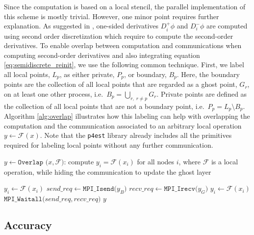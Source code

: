 Since the computation is based on a local stencil, the parallel implementation of this scheme is mostly trivial. However, one minor point requires further explanation. As suggested in \cite{Min;Gibou:07:A-second-order-accur}, one-sided derivatives $D^+_i \phi$ and $D^-_i \phi$ are computed using second order discretization which require to compute the second-order derivatives. To enable overlap between computation and communications when computing second-order derivatives and also integrating equation \eqref{eq:semidiscrete_reinit}, we use the following common technique. First, we label all local points, $L_p$, as either private, $P_p$, or boundary, $B_p$. Here, the boundary points are the collection of all local points that are regarded as a ghost point, $G_r$, on at least one other process, i.e.\ $B_p = \underset{r,\;r\neq p}{\bigcup} G_r$. Private points are defined as the collection of all local points that are not a boundary point, i.e.\ $P_p = L_p \setminus B_p$. Algorithm \ref{alg:overlap} illustrates how this labeling can help with overlapping the computation and the communication associated to an arbitrary local operation $y \gets \mathcal{F}(x)$. Note that the \texttt{p4est} library already includes all the primitives required for labeling local points without any further communication.

\begin{algorithm}[htbp]
\caption{$y \gets \texttt{Overlap (}x, \mathcal{F}\texttt{)}$: compute $y_i=\mathcal{F}(x_i)$ for all nodes $i$, where $\mathcal{F}$ is a local operation, while hiding the communication to update the ghost layer}
\begin{algorithmic}[1]
 
	\State $y_i \gets \mathcal{F}(x_i)$
\EndFor
\State $\mathit{send\_req} \gets \texttt{MPI\_Isend(}y_B\texttt{)}$ 
\State $\mathit{recv\_req} \gets \texttt{MPI\_Irecv(}y_G\texttt{)}$
 
	\State $y_i \gets \mathcal{F}(x_i)$ 
\EndFor
\State $\texttt{MPI\_Waitall(}\mathit{send\_req, recv\_req}\texttt{)}$ 
\State \Return $y$
\end{algorithmic}
\label{alg:overlap}
\end{algorithm}



\subsection{Accuracy} \label{sec:accuracy}


